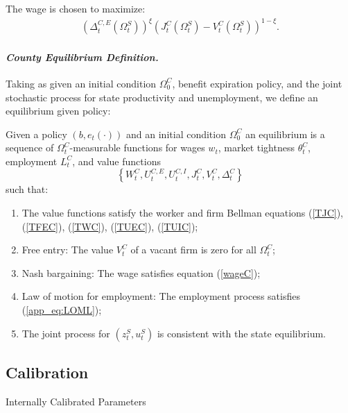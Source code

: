 \documentclass[12pt]{article}
\newcommand{\1}{\mathbf{1}}
\newcommand{\beq}{\begin{eqnarray}}
\newcommand{\eeq}{\end{eqnarray}}
\newenvironment{definition}[1][Definition]{\begin{trivlist}
\item[\hskip \labelsep {\bfseries #1}]}{\end{trivlist}}
\newcommand{\tct}{\theta^C_t}
\newcommand{\ost}{\Omega^S_t}
\newcommand{\oct}{\Omega^C_t}
\begin{document}
\begin{appendix}
The wage is chosen to maximize:
\beq
\left(\Delta_t^{C,E}\left(\ost\right)\right)^\xi\left(J^C_t\left(\ost\right)-V^C_t\left(\ost\right)\right)^{1-\xi}.
\label{wageC}
\eeq

\vspace{-0.4cm}\paragraph{\textit{County Equilibrium Definition.}}
Taking as given an initial condition $\Omega^C_0$, benefit expiration policy, and the joint stochastic process for state productivity and unemployment, we define an equilibrium given policy:

\begin{definition}
Given a policy $\left(b,e_t\left(\cdot\right)\right)$ and an initial condition $\Omega^C_0$ an equilibrium is a sequence of $\oct$-measurable functions for wages $w_t$, market tightness $\tct$, employment $L^C_t$, and value functions
\[\left\{W^C_t, U_t^{C,E}, U_t^{C,I}, J^C_t, V^C_t, \Delta^C_t\right\}\] such that:
\begin{enumerate}
\vspace{-0.2cm}\item The value functions satisfy the worker and firm Bellman equations (\ref{TJC}), (\ref{TFEC}), (\ref{TWC}), (\ref{TUEC}),  (\ref{TUIC});
\vspace{-0.2cm}\item Free entry: The value $V^C_t$ of a vacant firm is zero for all $\oct$;
\vspace{-0.2cm}\item Nash bargaining: The wage satisfies equation (\ref{wageC});
\vspace{-0.2cm}\item Law of motion for employment: The employment process satisfies (\ref{app_eq:LOML});
\vspace{-0.2cm}\item The joint process for $\left(z^S_t,u^S_t\right)$ is consistent with the state equilibrium.
\end{enumerate}
\end{definition}

\subsection{Calibration}

\begin{table}[t]
\centering
\caption{Internally Calibrated Parameters}
\small

\label{calib}
\vspace{-0.2cm}
\end{table}



\end{appendix}
\end{document}
